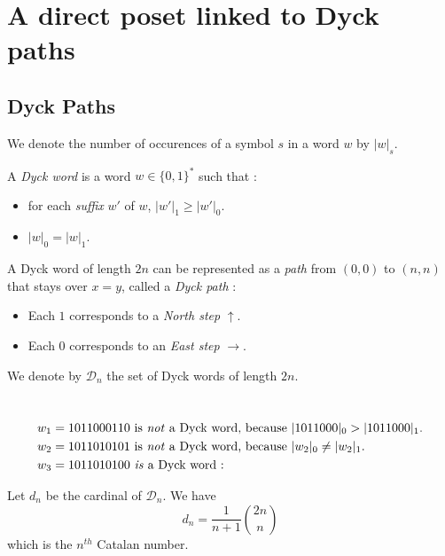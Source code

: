 \section{A direct poset linked to Dyck paths}

\subsection{Dyck Paths}

\begin{notation}
    We denote the number of occurences of a symbol $s$ in
    a word $w$ by $|w|_s$.
\end{notation}

\begin{definition}
    A \emph{Dyck word} is a word $w \in \{0,1\}^*$ such
    that :
    \begin{itemize}
        \item for each \emph{suffix} $w'$ of $w$,
            $|w'|_1 \geqslant |w'|_0$.
        \item $|w|_0 = |w|_1$.
    \end{itemize}
    A Dyck word of length $2n$ can be represented as a 
    \emph{path} from $(0,0)$ to $(n,n)$ that stays over
    $x = y$, called a \emph{Dyck path} :
    \begin{itemize}
        \item Each $1$ corresponds to a \emph{North step}
        $\uparrow$. 
        \item Each $0$ corresponds to an \emph{East step}
        $\rightarrow$.
    \end{itemize}
    We denote by $\mathcal{D}_n$ the set of Dyck words of
    length $2n$.
\end{definition}

\begin{example}[$n = 5$]
    ~\\
    \begin{align*}
        &w_1 = 1011000110 \text{ is \emph{not} a Dyck word,
        because } |1011000|_0 > |1011000|_1.\\
        &w_2 = 1011010101 \text{ is \emph{not} a Dyck word,
        because } |w_2|_0 \neq |w_2|_1.\\
        &w_3 = 1011010100 \text{ \emph{is} a Dyck word : }\\
    \end{align*}
    
\end{example}

\begin{theorem}
    Let $d_n$ be the cardinal of $\mathcal{D}_n$.
    We have $$d_n = \frac{1}{n + 1} \binom {2n}{n}$$
    which is the $n^{th}$ Catalan number.
\end{theorem}

